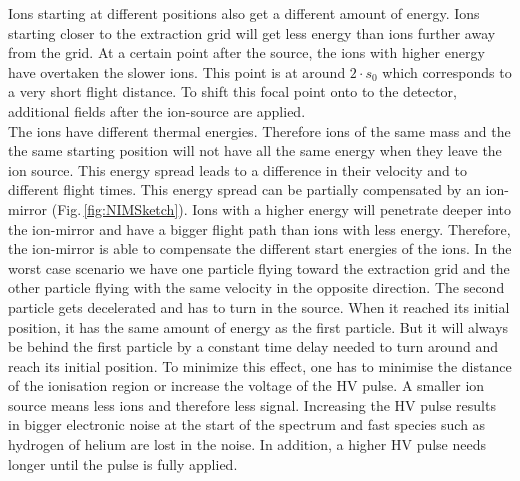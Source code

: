 	Ions starting at different positions also get a different amount of energy. Ions starting closer to the extraction grid will get less energy than ions further away from the grid. At a certain point after the source, the ions with higher energy have overtaken the slower ions. This point is at around $2\cdot s_0$ which corresponds to a very short flight distance. To shift this focal point onto to the detector, additional fields after the ion-source are applied.\\
	The ions have different thermal energies. Therefore ions of the same mass and the the same starting position will not have all the same energy when they leave the ion source. This energy spread leads to a difference in their velocity and to different flight times. This energy spread can be partially compensated by an ion-mirror (Fig.\,\ref{fig:NIMSketch}). Ions with a higher energy will penetrate deeper into the ion-mirror and have a bigger flight path than ions with less energy. Therefore, the ion-mirror is able to compensate the different start energies of the ions. %
	In the worst case scenario we have one particle flying toward the extraction grid and the other particle flying with the same velocity in the opposite direction. The second particle gets decelerated and has to turn in the source. When it reached its initial position, it has the same amount of energy as the first particle. But it will always be behind the first particle by a constant time delay needed to turn around and reach its initial position. To minimize this effect, one has to minimise the distance of the ionisation region or increase the voltage of the HV pulse. A smaller ion source means less ions and therefore less signal. Increasing the HV pulse results in bigger electronic noise at the start of the spectrum and fast species such as hydrogen of helium are lost in the noise. %
	In addition, a higher HV pulse needs longer until the pulse is fully applied.
	

